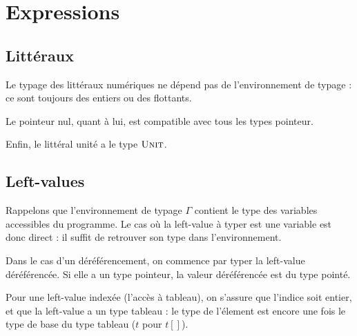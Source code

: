 \section{Expressions}

\subsection*{Littéraux}

Le typage des littéraux numériques ne dépend pas de l'environnement de typage :
ce sont toujours des entiers ou des flottants.

\begin{mathpar}



\end{mathpar}

Le pointeur nul, quant à lui, est compatible avec tous les types pointeur.

\begin{mathpar}
\end{mathpar}

Enfin, le littéral unité a le type $\tUnit$.

\begin{mathpar}
\end{mathpar}

\subsection*{Left-values}

Rappelons que l'environnement de typage $Γ$ contient le type des variables
accessibles du programme. Le cas où la left-value à typer est une variable est
donc direct : il suffit de retrouver son type dans l'environnement.

\begin{mathpar}
\end{mathpar}

Dans le cas d'un déréférencement, on commence par typer la left-value
déréférencée. Si elle a un type pointeur, la valeur déréférencée est du type
pointé.

\begin{mathpar}
\end{mathpar}

Pour une left-value indexée (l'accès à tableau), on s'assure que l'indice soit
entier, et que la left-value a un type tableau : le type de l'élement est encore
une fois le type de base du type tableau ($t$ pour $t[]$).

